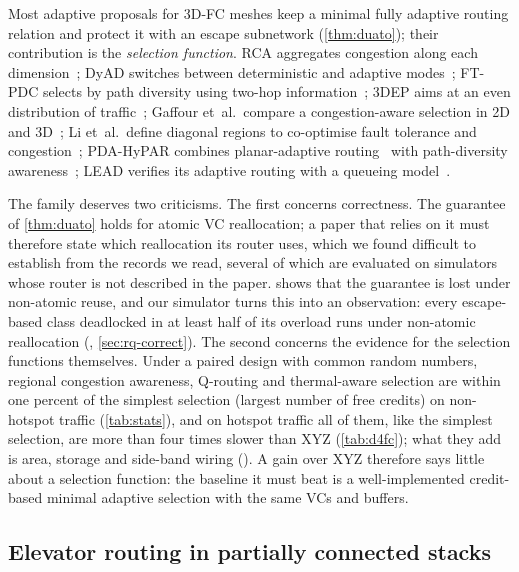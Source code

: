 Most adaptive proposals for 3D-FC meshes keep a minimal fully adaptive routing relation and protect it with an escape subnetwork (\cref{thm:duato}); their contribution is the \emph{selection function}. RCA aggregates congestion along each dimension~\cite{gratz2008rca}; DyAD switches between deterministic and adaptive modes~\cite{hu2004dyad}; FT-PDC selects by path diversity using two-hop information~\cite{khodadadi2022ftpdc}; 3DEP aims at an even distribution of traffic~\cite{vahdatpanah2019threedep}; Gaffour et~al.\ compare a congestion-aware selection in 2D and 3D~\cite{gaffour2023congestion}; Li et~al.\ define diagonal regions to co-optimise fault tolerance and congestion~\cite{jiao2023aftc}; PDA-HyPAR combines planar-adaptive routing~\cite{chien1995planar} with path-diversity awareness~\cite{dai2018pdahypar}; LEAD verifies its adaptive routing with a queueing model~\cite{salamat2018lead}.

The family deserves two criticisms. The first concerns correctness. The guarantee of \cref{thm:duato} holds for atomic VC reallocation; a paper that relies on it must therefore state which reallocation its router uses, which we found difficult to establish from the records we read, several of which are evaluated on simulators whose router is not described in the paper.  shows that the guarantee is lost under non-atomic reuse, and our simulator turns this into an observation: every escape-based class deadlocked in at least half of its overload runs under non-atomic reallocation (, \cref{sec:rq-correct}). The second concerns the evidence for the selection functions themselves. Under a paired design with common random numbers, regional congestion awareness, Q-routing and thermal-aware selection are within one percent of the simplest selection (largest number of free credits) on non-hotspot traffic (\cref{tab:stats}), and on hotspot traffic all of them, like the simplest selection, are more than four times slower than XYZ (\cref{tab:d4fc}); what they add is area, storage and side-band wiring (). A gain over XYZ therefore says little about a selection function: the baseline it must beat is a well-implemented credit-based minimal adaptive selection with the same VCs and buffers.

\subsection{Elevator routing in partially connected stacks}
\label{sec:rev-vpc}

